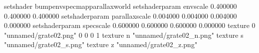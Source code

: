 setshader bumpenvspecmapparallaxworld
setshaderparam envscale 0.400000 0.400000 0.400000
setshaderparam parallaxscale 0.004000 0.004000 0.004000 0.000000
setshaderparam specscale 0.600000 0.600000 0.600000 0.000000
texture 0 "unnamed/grate02.png" 0 0 0 1
texture n "unnamed/grate02_n.png"
texture s "unnamed/grate02_s.png"
texture z "unnamed/grate02_z.png"